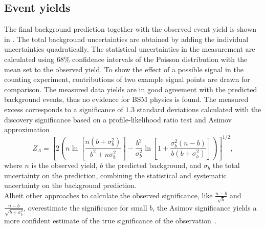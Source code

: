\subsection*{Event yields}
The final background prediction together with the observed event yield is shown in .
The total background uncertainties are obtained by adding the individual uncertainties quadratically. The statistical uncertainties in the measurement are calculated using $68\%$ confidence intervals of the Poisson distribution with the mean set to the observed yield.
To show the effect of a possible signal in the counting experiment, contributions of two example signal points are drawn for comparison. The measured data yields are in good agreement with the predicted background events, thus no evidence for BSM physics is found. The measured excess corresponds to a significance of $1.3$ standard deviations calculated with the discovery significance based on a profile-likelihood ratio test and Asimov approximation~\cite{Significance2}
\begin{equation}
 Z_A = \left[ 2\left( n\ln{\left[\frac{n(b+\sigma_{b}^2)}{b^2+n\sigma_{b}^2}\right]} -\frac{b^2}{\sigma_{b}^2} \ln \left[1+\frac{\sigma_b ^2 (n-b)}{b(b+\sigma_b ^2)} \right]  \right)    \right]^{1/2},
\end{equation}
where $n$ is the observed yield, $b$ the predicted background, and $\sigma_{b}$ the total uncertainty on the prediction, combining the statistical and systematic uncertainty on the background prediction.\\
Albeit other approaches to calculate the observed significance, like $\frac{n-b}{\sqrt{b}}$ and $\frac{n-b}{\sqrt{b+\sigma_b^2}}$, overestimate the significance for small $b$, the Asimov significance yields a more confident estimate of the true significance of the observation~\cite{Significance}.
